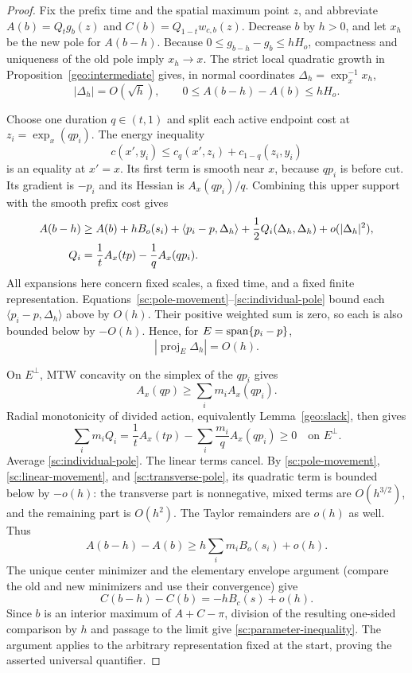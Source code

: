 \begin{proof}
Fix the prefix time and the spatial maximum point $z$, and abbreviate
$A(b)=Q_tg_b(z)$ and $C(b)=Q_{1-t}w_{c,b}(z)$.
Decrease $b$ by $h>0$, and let $x_h$ be the new pole for $A(b-h)$.
Because $0\leq g_{b-h}-g_b\leq hH_o$, compactness and uniqueness of
the old pole imply $x_h\to x$.
The strict local quadratic growth in
Proposition~\ref{geo:intermediate} gives, in normal coordinates
$\Delta_h=\exp_x^{-1}x_h$,
\begin{equation}
 |\Delta_h|=O(\sqrt h),\qquad 0\leq A(b-h)-A(b)\leq hH_o.
 \label{sc:pole-movement}
\end{equation}

Choose one duration $q\in(t,1)$ and split each active endpoint cost
at $z_i=\exp_x(qp_i)$.  The energy inequality
\[
 c(x',y_i)\leq c_q(x',z_i)+c_{1-q}(z_i,y_i)
\]
is an equality at $x'=x$.  Its first term is smooth near $x$, because
$qp_i$ is before cut.  Its gradient is $-p_i$ and its Hessian is
$A_x(qp_i)/q$.  Combining this upper support with the smooth prefix
cost gives
\begin{align}
 A(b-h)&\geq A(b)+hB_o(s_i)
       +\langle p_i-p,\Delta_h\rangle
       +\frac12 Q_i(\Delta_h,\Delta_h)+o(|\Delta_h|^2), \label{sc:individual-pole}\\
 Q_i&=\frac1t A_x(tp)-\frac1q A_x(qp_i).\notag
\end{align}
All expansions here concern fixed scales, a fixed time, and a fixed
finite representation.
Equations~\eqref{sc:pole-movement}--\eqref{sc:individual-pole} bound
each $\langle p_i-p,\Delta_h\rangle$ above by $O(h)$.
Their positive weighted sum is zero, so each is also bounded below by
$-O(h)$.  Hence, for $E=\operatorname{span}\{p_i-p\}$,
\begin{equation}
 |\operatorname{proj}_E\Delta_h|=O(h).
 \label{sc:linear-movement}
\end{equation}

On $E^\perp$, MTW concavity on the simplex of the $qp_i$ gives
\[
 A_x(qp)\geq\sum_i m_iA_x(qp_i).
\]
Radial monotonicity of divided action, equivalently
Lemma~\ref{geo:slack}, then gives
\begin{equation}
 \sum_i m_iQ_i
 =\frac1t A_x(tp)-\sum_i\frac{m_i}qA_x(qp_i)\geq0
 \quad\text{on }E^\perp.
 \label{sc:transverse-pole}
\end{equation}
Average \eqref{sc:individual-pole}.  The linear terms cancel.
By \eqref{sc:pole-movement}, \eqref{sc:linear-movement}, and
\eqref{sc:transverse-pole}, its quadratic term is bounded below by
$-o(h)$: the transverse part is nonnegative, mixed terms are
$O(h^{3/2})$, and the remaining part is $O(h^2)$.
The Taylor remainders are $o(h)$ as well.  Thus
\[
 A(b-h)-A(b)\geq h\sum_i m_iB_o(s_i)+o(h).
\]
The unique center minimizer and the elementary envelope argument
(compare the old and new minimizers and use their convergence) give
\[
 C(b-h)-C(b)=-hB_c(s)+o(h).
\]
Since $b$ is an interior maximum of $A+C-\pi$, division of the
resulting one-sided comparison by $h$ and passage to the limit give
\eqref{sc:parameter-inequality}.  The argument applies to the
arbitrary representation fixed at the start, proving the asserted
universal quantifier.
\end{proof}


